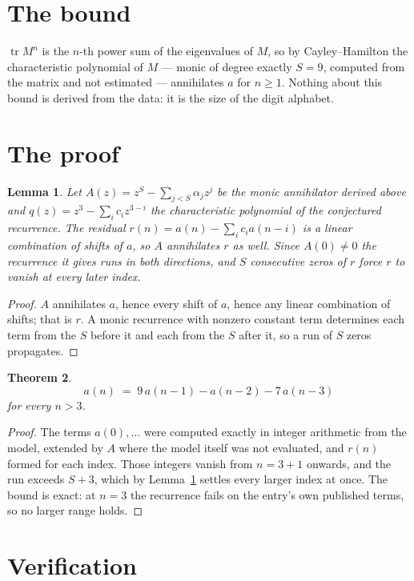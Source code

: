 \documentclass[11pt,a4paper]{article}
\theoremstyle{plain}
\newtheorem{theorem}{Theorem}
\newtheorem{lemma}[theorem]{Lemma}
\theoremstyle{definition}
\begin{document}
\section{The bound}

$\operatorname{tr}M^{n}$ is the $n$-th power sum of the eigenvalues of $M$, so by
Cayley--Hamilton the characteristic polynomial of $M$ --- monic of degree exactly $S=9$,
computed from the matrix and not estimated --- annihilates $a$ for $n\ge1$. Nothing about this
bound is derived from the data: it is the size of the digit alphabet.

\section{The proof}

\begin{lemma}\label{lem:crit}
Let $A(z)=z^S-\sum_{j<S}\alpha_jz^{j}$ be the monic annihilator derived above and
$q(z)=z^{3}-\sum_ic_iz^{3-i}$ the characteristic polynomial of the conjectured
recurrence. The residual $r(n)=a(n)-\sum_ic_ia(n-i)$ is a linear combination of shifts of $a$,
so $A$ annihilates $r$ as well. Since $A(0)\ne0$ the recurrence it gives runs in both
directions, and $S$ consecutive zeros of $r$ force $r$ to vanish at every later index.
\end{lemma}

\begin{proof}
$A$ annihilates $a$, hence every shift of $a$, hence any linear combination of shifts; that is
$r$. A monic recurrence with nonzero constant term determines each term from the $S$ before it
and each from the $S$ after it, so a run of $S$ zeros propagates.
\end{proof}

\begin{theorem}
\[
a(n)\;=\;9\,a(n-1) - a(n-2) - 7\,a(n-3)
\]
for every $n>3$.
\end{theorem}

\begin{proof}
The terms $a(0),\dots$ were computed exactly in integer arithmetic from the model, extended by
$A$ where the model itself was not evaluated, and $r(n)$ formed for each index. Those integers
vanish from $n=3+1$ onwards, and the run exceeds $S+3$, which by
Lemma~\ref{lem:crit} settles every larger index at once. The bound is exact: at $n=3$ the recurrence fails on the entry's own published terms, so no larger range holds.
\end{proof}

\section{Verification}
\end{document}
